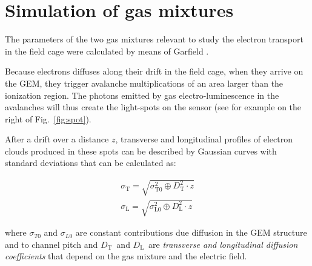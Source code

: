 \documentclass[a4paper,11pt]{article}
\newcommand{\Dt}  {$D_{\mathrm{T}}$}
\newcommand{\Dl}  {$D_{\mathrm{L}}$}
\begin{document}
\section{Simulation of gas mixtures}
\label{sect:simu}
The parameters of the two gas mixtures relevant to study the electron transport in the field cage were calculated
by means of Garfield \cite{bib:garfield1,bib:garfield2}.

Because electrons diffuses along their drift in the field cage, when they arrive on the GEM,
they trigger avalanche multiplications of an area larger than the ionization region. 
The photons emitted by gas electro-luminescence in the avalanches will thus create the light-spots on the sensor (see for example on the right of Fig.~\ref{fig:spot}).

After a drift over a distance $z$, transverse and longitudinal profiles of electron clouds produced in these spots can be described by Gaussian curves with standard deviations that can be calculated as:

\begin{eqnarray}
\label{eq:diff}
\sigma_{\mathrm{T}} = \sqrt{\sigma^2_{\mathrm{T0}} \oplus D^2_{\mathrm{T}} \cdot z} \\
\sigma_{\mathrm{L}} = \sqrt{\sigma^2_{\mathrm{L0}} \oplus D^2_{\mathrm{L}} \cdot z}
\end{eqnarray}

where $\sigma_{T0}$ and $\sigma_{L0}$ are constant contributions due diffusion in the GEM structure and to channel pitch and \Dt\ and \Dl\ are {\it transverse and longitudinal diffusion coefficients} that depend on the gas mixture and the electric field.
\end{document}
